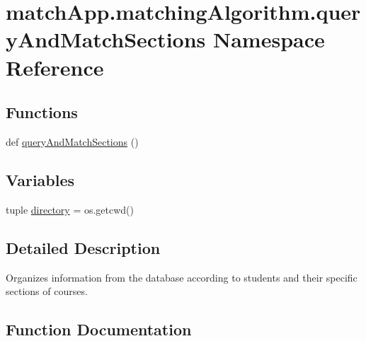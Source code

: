 \hypertarget{namespacematch_app_1_1matching_algorithm_1_1query_and_match_sections}{}\section{match\+App.\+matching\+Algorithm.\+query\+And\+Match\+Sections Namespace Reference}
\label{namespacematch_app_1_1matching_algorithm_1_1query_and_match_sections}
\subsection*{Functions}
\begin{DoxyCompactItemize}
\item 
def \hyperlink{namespacematch_app_1_1matching_algorithm_1_1query_and_match_sections_a3e86e2d2e95ae60932642651aaddfdd2}{query\+And\+Match\+Sections} ()
\end{DoxyCompactItemize}
\subsection*{Variables}
\begin{DoxyCompactItemize}
\item 
tuple \hyperlink{namespacematch_app_1_1matching_algorithm_1_1query_and_match_sections_a1fb8589712b684c335ad24e499b445fa}{directory} = os.\+getcwd()
\end{DoxyCompactItemize}


\subsection{Detailed Description}
\begin{DoxyVerb}Organizes information from the database according to students and their specific sections of courses.\end{DoxyVerb}
 

\subsection{Function Documentation}
\hypertarget{namespacematch_app_1_1matching_algorithm_1_1query_and_match_sections_a3e86e2d2e95ae60932642651aaddfdd2}{}
